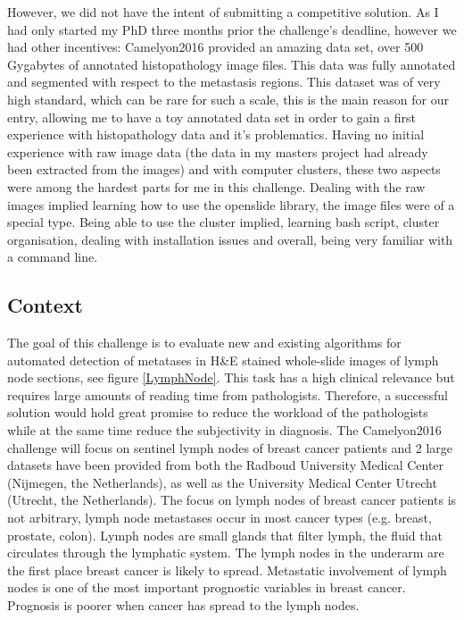 \documentclass[a4paper,10pt]{article}
\begin{document}
However, we did not have the intent of submitting a competitive
solution. As I had only started my PhD three months prior the
challenge's deadline, however we had other incentives: Camelyon2016
provided an amazing data set, over 500 Gygabytes of annotated
histopathology image files. This data was fully annotated and
segmented with respect to the metastasis regions. This dataset was of
very high standard, which can be rare for such a scale, this is the
main reason for our entry, allowing me to have a toy annotated data
set in order to gain a first experience with histopathology data and
it's problematics. Having no initial experience with raw image data
(the data in my masters project had already been extracted from the
images) and with computer clusters, these two aspects were among the
hardest parts for me in this challenge. Dealing with the raw images
implied learning how to use the openslide library, the image files
were of a special type. Being able to use the cluster implied,
learning bash script, cluster organisation, dealing with installation
issues and overall, being very familiar with a command line. 

\subsection{Context}
The goal of this challenge is to evaluate new and existing algorithms for automated detection of metatases in H\&E stained whole-slide images of lymph node sections, see figure \ref{LymphNode}. This task has a high clinical relevance but requires large amounts of reading time from pathologists. Therefore, a successful solution would hold great promise to reduce the workload of the pathologists while at the same time reduce the subjectivity in diagnosis. The Camelyon2016 challenge will focus on sentinel lymph nodes of breast cancer patients and 2 large datasets have been provided from both the Radboud University Medical Center (Nijmegen, the Netherlands), as well as the University Medical Center Utrecht (Utrecht, the Netherlands). The focus on lymph nodes of breast cancer patients is not arbitrary, lymph node metastases occur in most cancer types (e.g. breast, prostate, colon). Lymph nodes are small glands that filter lymph, the fluid that circulates through the lymphatic system. The lymph nodes in the underarm are the first place breast cancer is likely to spread. Metastatic involvement of lymph nodes is one of the most important prognostic variables in breast cancer. Prognosis is poorer when cancer has spread to the lymph nodes.
\end{document}
